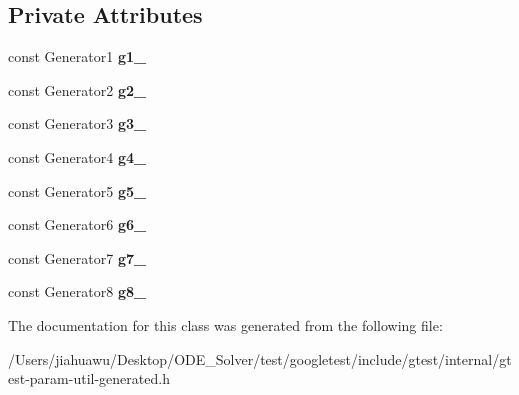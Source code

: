\subsection*{Private Attributes}
\begin{DoxyCompactItemize}
\item 
\mbox{\label{classtesting_1_1internal_1_1_cartesian_product_holder8_a2b8ddbf3089772ad7f72fda55ccc7619}} 
const Generator1 {\bfseries g1\+\_\+}
\item 
\mbox{\label{classtesting_1_1internal_1_1_cartesian_product_holder8_a2cc5c2260e92420d62ddf92a65a12ae9}} 
const Generator2 {\bfseries g2\+\_\+}
\item 
\mbox{\label{classtesting_1_1internal_1_1_cartesian_product_holder8_ad23e73ea1c02994e35bde78e9f2970c4}} 
const Generator3 {\bfseries g3\+\_\+}
\item 
\mbox{\label{classtesting_1_1internal_1_1_cartesian_product_holder8_aff1efff76694a878b1d89a8142ad8a31}} 
const Generator4 {\bfseries g4\+\_\+}
\item 
\mbox{\label{classtesting_1_1internal_1_1_cartesian_product_holder8_a76835e24663f1e188cab3719a736aa17}} 
const Generator5 {\bfseries g5\+\_\+}
\item 
\mbox{\label{classtesting_1_1internal_1_1_cartesian_product_holder8_ae4ea6cb4a0a257c2627a24e92fcc01cd}} 
const Generator6 {\bfseries g6\+\_\+}
\item 
\mbox{\label{classtesting_1_1internal_1_1_cartesian_product_holder8_a8c1a3c407a3694515efaf1904bcb91c4}} 
const Generator7 {\bfseries g7\+\_\+}
\item 
\mbox{\label{classtesting_1_1internal_1_1_cartesian_product_holder8_a83fea6a85f0a7227855e383572bdcd03}} 
const Generator8 {\bfseries g8\+\_\+}
\end{DoxyCompactItemize}


The documentation for this class was generated from the following file\+:\begin{DoxyCompactItemize}
\item 
/\+Users/jiahuawu/\+Desktop/\+O\+D\+E\+\_\+\+Solver/test/googletest/include/gtest/internal/gtest-\/param-\/util-\/generated.\+h\end{DoxyCompactItemize}
